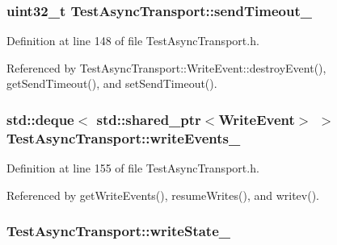 \subsubsection[{send\+Timeout\+\_\+}]{\setlength{\rightskip}{0pt plus 5cm}uint32\+\_\+t Test\+Async\+Transport\+::send\+Timeout\+\_\+\hspace{0.3cm}{\ttfamily [private]}}\label{classTestAsyncTransport_af83665d1d83f2cc5a37e349c75985780}


Definition at line 148 of file Test\+Async\+Transport.\+h.



Referenced by Test\+Async\+Transport\+::\+Write\+Event\+::destroy\+Event(), get\+Send\+Timeout(), and set\+Send\+Timeout().

\subsubsection[{write\+Events\+\_\+}]{\setlength{\rightskip}{0pt plus 5cm}std\+::deque$<$ std\+::shared\+\_\+ptr$<${\bf Write\+Event}$>$ $>$ Test\+Async\+Transport\+::write\+Events\+\_\+\hspace{0.3cm}{\ttfamily [private]}}\label{classTestAsyncTransport_aa35af69247ce015d3e0f62d3ae438c96}


Definition at line 155 of file Test\+Async\+Transport.\+h.



Referenced by get\+Write\+Events(), resume\+Writes(), and writev().

\subsubsection[{write\+State\+\_\+}]{ Test\+Async\+Transport\+::write\+State\+\_\+\hspace{0.3cm}{\ttfamily [private]}}\label{classTestAsyncTransport_ab2fcfdfed39ccd4f68c4e0496ecca4da}


